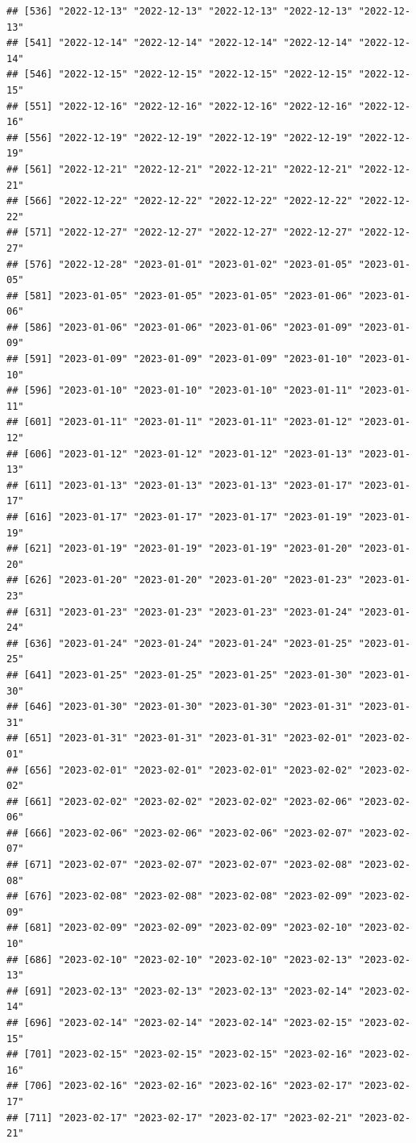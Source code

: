 \documentclass[
]{article}
\begin{document}
\begin{verbatim}
## [536] "2022-12-13" "2022-12-13" "2022-12-13" "2022-12-13" "2022-12-13"
## [541] "2022-12-14" "2022-12-14" "2022-12-14" "2022-12-14" "2022-12-14"
## [546] "2022-12-15" "2022-12-15" "2022-12-15" "2022-12-15" "2022-12-15"
## [551] "2022-12-16" "2022-12-16" "2022-12-16" "2022-12-16" "2022-12-16"
## [556] "2022-12-19" "2022-12-19" "2022-12-19" "2022-12-19" "2022-12-19"
## [561] "2022-12-21" "2022-12-21" "2022-12-21" "2022-12-21" "2022-12-21"
## [566] "2022-12-22" "2022-12-22" "2022-12-22" "2022-12-22" "2022-12-22"
## [571] "2022-12-27" "2022-12-27" "2022-12-27" "2022-12-27" "2022-12-27"
## [576] "2022-12-28" "2023-01-01" "2023-01-02" "2023-01-05" "2023-01-05"
## [581] "2023-01-05" "2023-01-05" "2023-01-05" "2023-01-06" "2023-01-06"
## [586] "2023-01-06" "2023-01-06" "2023-01-06" "2023-01-09" "2023-01-09"
## [591] "2023-01-09" "2023-01-09" "2023-01-09" "2023-01-10" "2023-01-10"
## [596] "2023-01-10" "2023-01-10" "2023-01-10" "2023-01-11" "2023-01-11"
## [601] "2023-01-11" "2023-01-11" "2023-01-11" "2023-01-12" "2023-01-12"
## [606] "2023-01-12" "2023-01-12" "2023-01-12" "2023-01-13" "2023-01-13"
## [611] "2023-01-13" "2023-01-13" "2023-01-13" "2023-01-17" "2023-01-17"
## [616] "2023-01-17" "2023-01-17" "2023-01-17" "2023-01-19" "2023-01-19"
## [621] "2023-01-19" "2023-01-19" "2023-01-19" "2023-01-20" "2023-01-20"
## [626] "2023-01-20" "2023-01-20" "2023-01-20" "2023-01-23" "2023-01-23"
## [631] "2023-01-23" "2023-01-23" "2023-01-23" "2023-01-24" "2023-01-24"
## [636] "2023-01-24" "2023-01-24" "2023-01-24" "2023-01-25" "2023-01-25"
## [641] "2023-01-25" "2023-01-25" "2023-01-25" "2023-01-30" "2023-01-30"
## [646] "2023-01-30" "2023-01-30" "2023-01-30" "2023-01-31" "2023-01-31"
## [651] "2023-01-31" "2023-01-31" "2023-01-31" "2023-02-01" "2023-02-01"
## [656] "2023-02-01" "2023-02-01" "2023-02-01" "2023-02-02" "2023-02-02"
## [661] "2023-02-02" "2023-02-02" "2023-02-02" "2023-02-06" "2023-02-06"
## [666] "2023-02-06" "2023-02-06" "2023-02-06" "2023-02-07" "2023-02-07"
## [671] "2023-02-07" "2023-02-07" "2023-02-07" "2023-02-08" "2023-02-08"
## [676] "2023-02-08" "2023-02-08" "2023-02-08" "2023-02-09" "2023-02-09"
## [681] "2023-02-09" "2023-02-09" "2023-02-09" "2023-02-10" "2023-02-10"
## [686] "2023-02-10" "2023-02-10" "2023-02-10" "2023-02-13" "2023-02-13"
## [691] "2023-02-13" "2023-02-13" "2023-02-13" "2023-02-14" "2023-02-14"
## [696] "2023-02-14" "2023-02-14" "2023-02-14" "2023-02-15" "2023-02-15"
## [701] "2023-02-15" "2023-02-15" "2023-02-15" "2023-02-16" "2023-02-16"
## [706] "2023-02-16" "2023-02-16" "2023-02-16" "2023-02-17" "2023-02-17"
## [711] "2023-02-17" "2023-02-17" "2023-02-17" "2023-02-21" "2023-02-21"

\end{verbatim}
\end{document}
